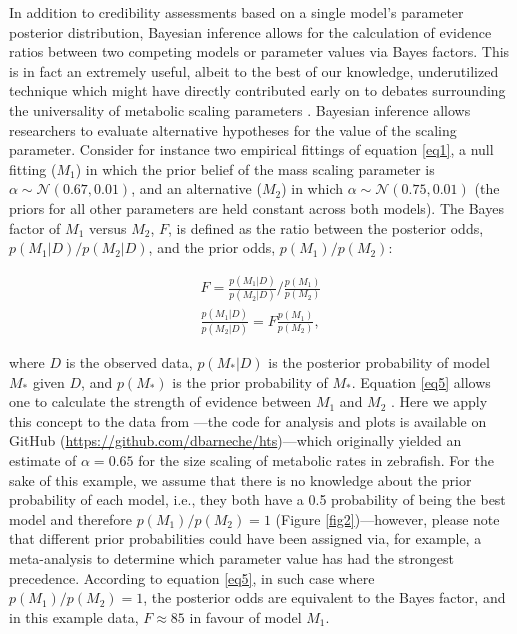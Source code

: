 \documentclass[a4paper,12pt]{article}
\begin{document}
In addition to credibility assessments based on a single model's parameter posterior distribution, Bayesian inference allows for the calculation of evidence ratios between two competing models or parameter values via Bayes factors. This is in fact an extremely useful, albeit to the best of our knowledge, underutilized technique which might have directly contributed early on to debates surrounding the universality of metabolic scaling parameters \citep[e.g., is $\alpha$ = 3/4 or 2/3;][]{west1999science, glazier2005biolrev, moses2008amnat}. Bayesian inference allows researchers to evaluate alternative hypotheses for the value of the scaling parameter. Consider for instance two empirical fittings of equation \ref{eq1}, a null fitting ($M_1$) in which the prior belief of the mass scaling parameter is $\alpha \sim \mathcal{N}(0.67, 0.01)$, and an alternative ($M_2$) in which $\alpha \sim \mathcal{N}(0.75, 0.01)$ (the priors for all other parameters are held constant across both models). The Bayes factor of $M_1$ versus $M_2$, $F$, is defined as the ratio between the posterior odds, $p(M_1 | D)/p(M_2 | D)$, and the prior odds, $p(M_1)/p(M_2)$:

\begin{equation}
\begin{split}
  F = \frac{p(M_1 | D)}{p(M_2 | D)} / \frac{p(M_1)}{p(M_2)} \\
  \frac{p(M_1 | D)}{p(M_2 | D)} = F \frac{p(M_1)}{p(M_2)},
  \label{eq5}
\end{split}
\end{equation}

where $D$ is the observed data, $p(M_\ast | D)$ is the posterior probability of model $M_\ast$ given $D$, and $p(M_\ast)$ is the prior probability of $M_\ast$. Equation \ref{eq5} allows one to calculate the strength of evidence between $M_1$ and $M_2$ \citep{benjamin2017nathumbeh, kruscke2018psybullrev, lakens2022tree}. Here we apply this concept to the data from \cite{barneche2019functecol}---the code for analysis and plots is available on GitHub (\url{https://github.com/dbarneche/hts})---which originally yielded an estimate of $\alpha = 0.65$ for the size scaling of metabolic rates in zebrafish. For the sake of this example, we assume that there is no knowledge about the prior probability of each model, i.e., they both have a 0.5 probability of being the best model and therefore $p(M_1)/p(M_2) = 1$ (Figure \ref{fig2})---however, please note that different prior probabilities could have been assigned via, for example, a meta-analysis to determine which parameter value has had the strongest precedence. According to equation \ref{eq5}, in such case where $p(M_1)/p(M_2) = 1$, the posterior odds are equivalent to the Bayes factor, and in this example data, $F \approx 85$ in favour of model $M_1$.
\end{document}

